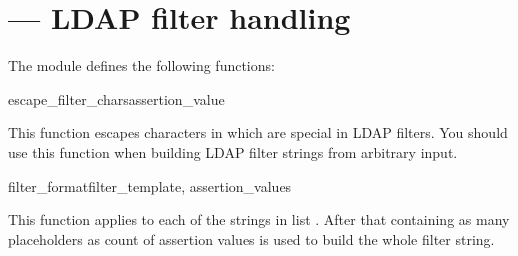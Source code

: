 
\section{ ---
  LDAP filter handling }




The  module defines the following functions:

\begin{funcdesc}{escape_filter_chars}{assertion_value} %

This function escapes characters in  which
are special in LDAP filters. You should use this function when
building LDAP filter strings from arbitrary input.

\begin{seealso}
\end{seealso}

\end{funcdesc}

\begin{funcdesc}{filter_format}{filter_template, assertion_values} %

This function applies  to each of the strings in
list . After that  containing
as many  placeholders as count of assertion values is
used to build the whole filter string.

\end{funcdesc}

